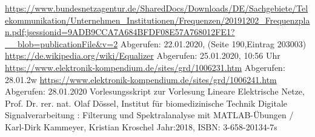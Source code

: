 \begin{thebibliography}{99}

 \url{https://www.bundesnetzagentur.de/SharedDocs/Downloads/DE/Sachgebiete/Telekommunikation/Unternehmen_Institutionen/Frequenzen/20191202_Frequenzplan.pdf;jsessionid=9ADB9CCA7A684BFDF08E57A768012FE1?__blob=publicationFile&v=2} Abgerufen: 22.01.2020, (Seite 190,Eintrag 203003)
 \url{https://de.wikipedia.org/wiki/Equalizer} Abgerufen: 25.01.2020, 10:56 Uhr
 \url{https://www.elektronik-kompendium.de/sites/grd/1006231.htm}
Abgerufen: 28.01.2w
 \url{https://www.elektronik-kompendium.de/sites/grd/1006241.htm} Abgerufen: 28.01.2020
 Vorlesungsskript zur Vorlesung Lineare Elektrische Netze, Prof. Dr. rer. nat. Olaf Dössel, Institut für biomedizinische Technik
 Digitale Signalverarbeitung : Filterung und Spektralanalyse mit MATLAB-Übungen / Karl-Dirk Kammeyer, Kristian Kroschel Jahr:2018, ISBN: 3-658-20134-7s








\end{thebibliography}
